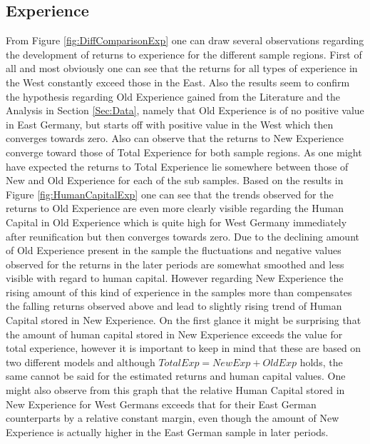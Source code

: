 \subsection{Experience}
From Figure \ref{fig:DiffComparisonExp} one can draw several observations regarding the development of returns to experience for the different sample regions. First of all and most obviously one can see that the returns for all types of experience in the West constantly exceed those in the East. Also the results seem to confirm the hypothesis regarding Old Experience gained from the Literature and the Analysis in Section \ref{Sec:Data}, namely that Old Experience is of no positive value in East Germany, but starts off with positive value in the West which then converges towards zero. Also can observe that the returns to New Experience converge toward those of Total Experience for both sample regions. As one might have expected the returns to Total Experience lie somewhere between those of New and Old Experience for each of the sub samples.
Based on the results in Figure \ref{fig:HumanCapitalExp} one can see that the trends observed for the returns to Old Experience are even more clearly visible regarding the Human Capital in Old Experience which is quite high for West Germany immediately after reunification but then converges towards zero. Due to the declining amount of Old Experience present in the sample the fluctuations and negative values observed for the returns in the later periods are somewhat smoothed and less visible with regard to human capital.
However regarding New Experience the rising amount of this kind of experience in the samples more than compensates the falling returns observed above and lead to slightly rising trend of Human Capital stored in New Experience. On the first glance it might be surprising that the amount of human capital stored in New Experience exceeds the value for total experience, however it is important to keep in mind that these are based on two different models and although $TotalExp = NewExp + OldExp$ holds, the same cannot be said for the estimated returns and human capital values. One might also observe from this graph that the relative Human Capital stored in New Experience for West Germans exceeds that for their East German counterparts by a relative constant margin, even though the amount of New Experience is actually higher in the East German sample in later periods.



